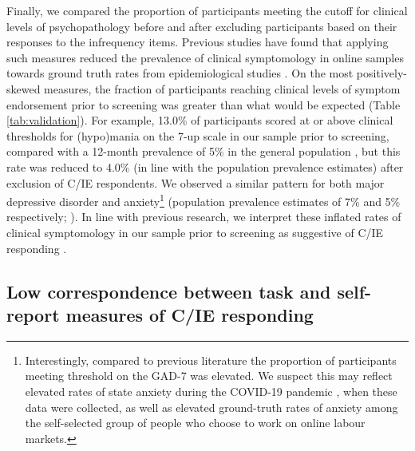 \documentclass[a4paper,notitlepage,12pt]{article}
\begin{document}
Finally, we compared the proportion of participants meeting the cutoff for clinical levels of psychopathology before and after excluding participants based on their responses to the infrequency items. Previous studies have found that applying such measures reduced the prevalence of clinical symptomology in online samples towards ground truth rates from epidemiological studies \cite{ophir2020turker}. On the most positively-skewed measures, the fraction of participants reaching clinical levels of symptom endorsement prior to screening was greater than what would be expected (Table \ref{tab:validation}). For example, 13.0\% of participants scored at or above clinical thresholds for (hypo)mania on the 7-up scale in our sample prior to screening, compared with a 12-month prevalence of 5\% in the general population \cite{merikangas2007lifetime, merikangas2012true}, but this rate was reduced to 4.0\% (in line with the population prevalence estimates) after exclusion of C/IE respondents. We observed a similar pattern for both major depressive disorder and anxiety\footnote{Interestingly, compared to previous literature the proportion of participants meeting threshold on the GAD-7 was elevated. We suspect this may reflect elevated rates of state anxiety during the COVID-19 pandemic \cite{yarrington2021impact}, when these data were collected, as well as elevated ground-truth rates of anxiety among the self-selected group of people who choose to work on online labour markets.} (population prevalence estimates of 7\% and 5\% respectively; \cite{kessler2012twelve, lowe2008validation, hinz2017psychometric}).  In line with previous research, we interpret these inflated rates of clinical symptomology in our sample prior to screening as suggestive of C/IE responding \cite{ophir2020turker}.

\subsection{Low correspondence between task and self-report measures of C/IE responding}
\end{document}
